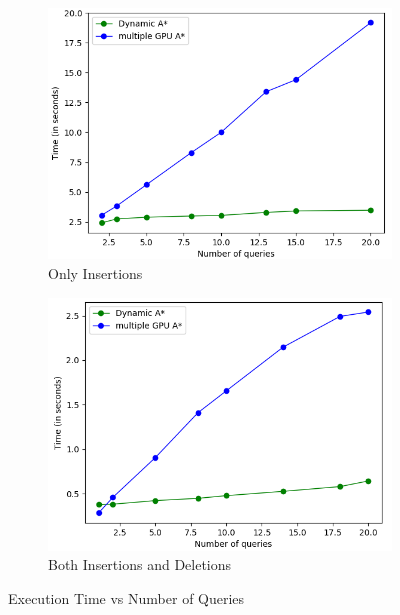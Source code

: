 \documentclass[a4paper]{article}
\begin{document}
\begin{figure}[H]
    \centering
    \begin{subfigure}[b]{0.47\textwidth}
         \centering
         \includegraphics[width=\textwidth]{img/TvQ_wikitalk.png}
         \caption{Only Insertions}
         \label{fig:query_trend_ins}
    \end{subfigure}
    \hfill
    \begin{subfigure}[b]{0.47\textwidth}
        \centering
         \includegraphics[width=\textwidth]{img/QvT_dyn.png}
         \caption{Both Insertions and Deletions}
         \label{fig:query_trend_dyn}
    \end{subfigure}
    \caption{Execution Time vs Number of Queries}
    \label{fig:query_trend}
\end{figure}
\end{document}
